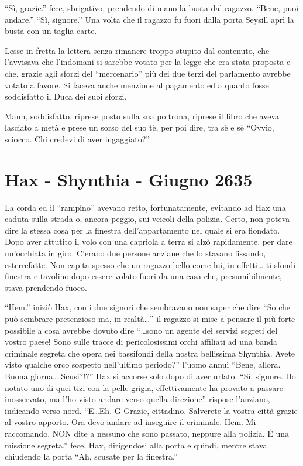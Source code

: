     ``Sì, grazie.'' fece, sbrigativo, prendendo di mano la busta dal
    ragazzo. ``Bene, puoi andare.'' ``Sì, signore.'' Una volta che il
    ragazzo fu fuori dalla porta Seysill aprì la busta con un taglia carte.

    Lesse in fretta la lettera senza rimanere troppo stupito dal contenuto,
    che l'avvisava che l'indomani si sarebbe votato per la legge che era
    stata proposta e che, grazie agli sforzi del ``mercenario'' più dei due
    terzi del parlamento avrebbe votato a favore. Si faceva anche menzione
    al pagamento ed a quanto fosse soddisfatto il Duca dei suoi sforzi.

    Mann, soddisfatto, riprese posto sulla sua poltrona, riprese il libro
    che aveva lasciato a metà e prese un sorso del suo tè, per poi dire,
    tra sè e sè ``Ovvio, sciocco. Chi credevi di aver ingaggiato?''

    \section{Hax - Shynthia - Giugno 2635}
    La corda ed il ``rampino'' avevano retto, fortunatamente, evitando ad
    Hax una caduta sulla strada o, ancora peggio, sui veicoli della
    polizia. Certo, non poteva dire la stessa cosa per la finestra
    dell'appartamento nel quale si era fiondato. Dopo aver attutito il
    volo con una capriola a terra si alzò rapidamente, per dare un'occhiata
    in giro. C'erano due persone anziane che lo stavano fissando,
    esterrefatte. Non capita spesso che un ragazzo bello come lui, in
    effetti\dots{} ti sfondi finestra e tavolino dopo essere volato fuori
    da una casa che, presumibilmente, stava prendendo fuoco.

    ``Hem.'' iniziò Hax, con i due signori che sembravano non saper che
    dire ``So che può sembrare pretenzioso ma, in realtà\dots{}'' il
    ragazzo si mise a pensare il più forte possibile a cosa avrebbe dovuto
    dire ``\dots{}sono un agente dei servizi segreti del vostro paese! Sono
    sulle tracce di pericolosissimi orchi affiliati ad una banda criminale
    segreta che opera nei bassifondi della nostra bellissima Shynthia.
    Avete visto qualche orco sospetto nell'ultimo periodo?'' l'uomo annuì
    ``Bene, allora. Buona giorna\dots{} Scusi?!?'' Hax si accorse solo dopo
    di aver urlato. ``Sì, signore. Ho notato uno di quei tizi con la pelle
    grigia, effettivamente ha provato a passare inosservato, ma l'ho visto
    andare verso quella direzione'' rispose l'anziano, indicando verso
    nord. ``E\dots{}Eh. G-Grazie, cittadino. Salverete la vostra città
    grazie al vostro apporto. Ora devo andare ad inseguire il criminale.
    Hem. Mi raccomando. NON dite a nessuno che sono passato, neppure alla
    polizia. \'E una missione segreta.'' fece, Hax, dirigendosi alla porta
    e quindi, mentre stava chiudendo la porta ``Ah, scusate per la
    finestra.''

